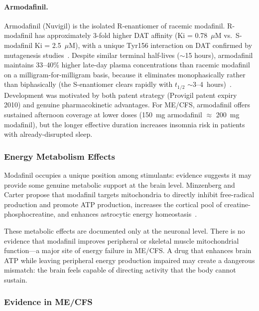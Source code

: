 \paragraph{Armodafinil.}
Armodafinil (Nuvigil) is the isolated R-enantiomer of racemic modafinil. R-modafinil has approximately 3-fold higher DAT affinity (Ki = 0.78~$\mu$M vs.\ S-modafinil Ki = 2.5~$\mu$M), with a unique Tyr156 interaction on DAT confirmed by mutagenesis studies~\cite{Lohi2014armodafinilDAT}. Despite similar terminal half-lives (${\sim}$15 hours), armodafinil maintains 33--40\% higher late-day plasma concentrations than racemic modafinil on a milligram-for-milligram basis, because it eliminates monophasically rather than biphasically (the S-enantiomer clears rapidly with $t_{1/2}$ ${\sim}$3--4~hours)~\cite{Darwish2009armodafinil}. Development was motivated by both patent strategy (Provigil patent expiry 2010) and genuine pharmacokinetic advantages. For ME/CFS, armodafinil offers sustained afternoon coverage at lower doses (150~mg armodafinil $\approx$ 200~mg modafinil), but the longer effective duration increases insomnia risk in patients with already-disrupted sleep.

\subsubsection{Energy Metabolism Effects}

Modafinil occupies a unique position among stimulants: evidence suggests it may provide some genuine metabolic support at the brain level. Minzenberg and Carter propose that modafinil targets mitochondria to directly inhibit free-radical production and promote ATP production, increases the cortical pool of creatine-phosphocreatine, and enhances astrocytic energy homeostasis~\cite{Minzenberg2008modafinil}.

\begin{limitation}
These metabolic effects are documented only at the neuronal level. There is no evidence that modafinil improves peripheral or skeletal muscle mitochondrial function---a major site of energy failure in ME/CFS. A drug that enhances brain ATP while leaving peripheral energy production impaired may create a dangerous mismatch: the brain feels capable of directing activity that the body cannot sustain.
\end{limitation}

\subsubsection{Evidence in ME/CFS}

